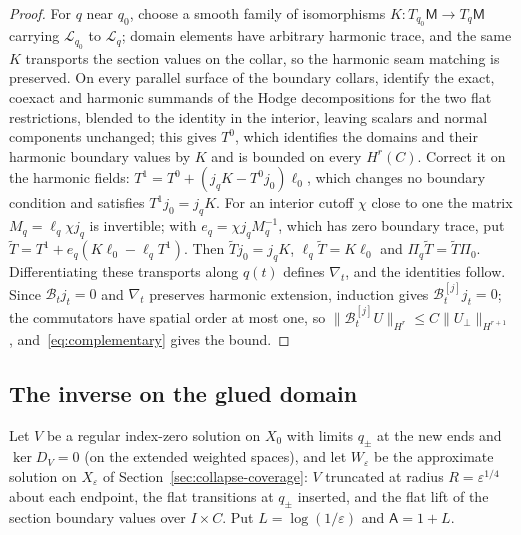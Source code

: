 \documentclass[11pt]{amsart}
\theoremstyle{definition}
\theoremstyle{remark}
\theoremstyle{plain}
\numberwithin{equation}{section}
\newcommand{\Msf}{\mathsf{M}}
\newcommand{\eps}{\varepsilon}
\begin{document}
\begin{proof}
For $q$ near $q_0$, choose a smooth family of isomorphisms $K\colon T_{q_0}\Msf\to T_q\Msf$
carrying $\mathscr L_{q_0}$ to $\mathscr L_q$; domain elements have arbitrary harmonic
trace, and the same $K$ transports the section values on the collar, so the
harmonic seam matching is preserved. On every
parallel surface of the boundary collars, identify the exact, coexact and
harmonic summands of the Hodge decompositions for the two flat restrictions,
blended to the identity in the interior, leaving scalars and normal
components unchanged; this gives $T^0$, which identifies the domains and their
harmonic boundary values by $K$ and is bounded on every $H^r(C)$. Correct it on
the harmonic fields: $T^1=T^0+(j_qK-T^0j_0)\ell_0$, which changes no boundary
condition and satisfies $T^1j_0=j_qK$. For an interior cutoff $\chi$ close to one
the matrix $M_q=\ell_q\chi j_q$ is invertible; with $e_q=\chi j_qM_q^{-1}$, which has
zero boundary trace, put $\widetilde T=T^1+e_q(K\ell_0-\ell_qT^1)$. Then
$\widetilde Tj_0=j_qK$, $\ell_q\widetilde T=K\ell_0$ and
$\Pi_q\widetilde T=\widetilde T\Pi_0$. Differentiating these transports along
$q(t)$ defines $\nabla_t$, and the identities follow. Since $\mathcal B_tj_t=0$ and
$\nabla_t$ preserves harmonic extension, induction gives
$\mathcal B^{[j]}_tj_t=0$; the commutators have spatial order at most one, so
$\|\mathcal B^{[j]}_tU\|_{H^r}\le C\|U_\perp\|_{H^{r+1}}$, and~\eqref{eq:complementary}
gives the bound.
\end{proof}

\subsection{The inverse on the glued domain}\label{subsec:patching}

Let $V$ be a regular index-zero solution on $X_0$ with limits $q_\pm$ at the
new ends and $\ker D_V=0$ (on the extended weighted spaces), and let $W_\eps$ be the
approximate solution on $X_\eps$ of Section~\ref{sec:collapse-coverage}:
$V$ truncated at radius $R=\eps^{1/4}$ about each endpoint, the flat
transitions at $q_\pm$ inserted, and the flat lift of the section boundary
values over $I\times C$. Put $L=\log(1/\eps)$ and $\mathsf A=1+L$.
\end{document}
